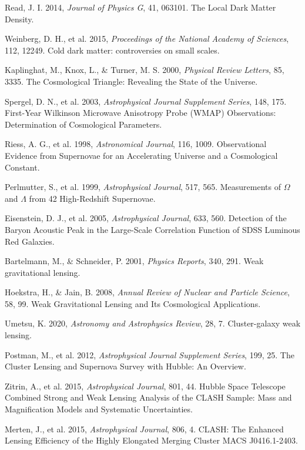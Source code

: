 \documentclass[12pt,a4paper]{article}
\begin{document}
\begin{thebibliography}{99}
 Read, J. I. 2014, \textit{Journal of Physics G}, 41, 063101. The Local Dark Matter Density.

 Weinberg, D. H., et al. 2015, \textit{Proceedings of the National Academy of Sciences}, 112, 12249. Cold dark matter: controversies on small scales.

 Kaplinghat, M., Knox, L., \& Turner, M. S. 2000, \textit{Physical Review Letters}, 85, 3335. The Cosmological Triangle: Revealing the State of the Universe.

 Spergel, D. N., et al. 2003, \textit{Astrophysical Journal Supplement Series}, 148, 175. First-Year Wilkinson Microwave Anisotropy Probe (WMAP) Observations: Determination of Cosmological Parameters.

 Riess, A. G., et al. 1998, \textit{Astronomical Journal}, 116, 1009. Observational Evidence from Supernovae for an Accelerating Universe and a Cosmological Constant.

 Perlmutter, S., et al. 1999, \textit{Astrophysical Journal}, 517, 565. Measurements of $\Omega$ and $\Lambda$ from 42 High-Redshift Supernovae.

 Eisenstein, D. J., et al. 2005, \textit{Astrophysical Journal}, 633, 560. Detection of the Baryon Acoustic Peak in the Large-Scale Correlation Function of SDSS Luminous Red Galaxies.

 Bartelmann, M., \& Schneider, P. 2001, \textit{Physics Reports}, 340, 291. Weak gravitational lensing.

 Hoekstra, H., \& Jain, B. 2008, \textit{Annual Review of Nuclear and Particle Science}, 58, 99. Weak Gravitational Lensing and Its Cosmological Applications.

 Umetsu, K. 2020, \textit{Astronomy and Astrophysics Review}, 28, 7. Cluster-galaxy weak lensing.

 Postman, M., et al. 2012, \textit{Astrophysical Journal Supplement Series}, 199, 25. The Cluster Lensing and Supernova Survey with Hubble: An Overview.

 Zitrin, A., et al. 2015, \textit{Astrophysical Journal}, 801, 44. Hubble Space Telescope Combined Strong and Weak Lensing Analysis of the CLASH Sample: Mass and Magnification Models and Systematic Uncertainties.

 Merten, J., et al. 2015, \textit{Astrophysical Journal}, 806, 4. CLASH: The Enhanced Lensing Efficiency of the Highly Elongated Merging Cluster MACS J0416.1-2403.


\end{thebibliography}
\end{document}
